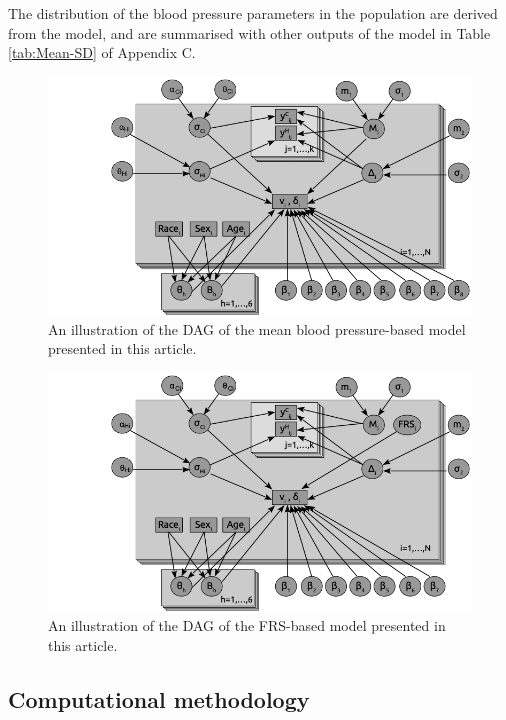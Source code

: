 \documentclass[
]{article}
\begin{document}
The distribution of the blood pressure parameters in the population are derived from the model, and are summarised with other outputs of the model in Table \ref{tab:Mean-SD} of Appendix C.

\begin{figure}
\hypertarget{fig:DAGmean}{%
\centering
\includegraphics{./DAG_Mean2.png}
\caption{An illustration of the DAG of the mean blood pressure-based model presented in this article.}\label{fig:DAGmean}
}
\end{figure}

\begin{figure}
\hypertarget{fig:DAGFRS}{%
\centering
\includegraphics{./DAG_FRS2.png}
\caption{An illustration of the DAG of the FRS-based model presented in this article.}\label{fig:DAGFRS}
}
\end{figure}

\hypertarget{computational-methodology}{%
\subsection{Computational methodology}\label{computational-methodology}}
\end{document}
